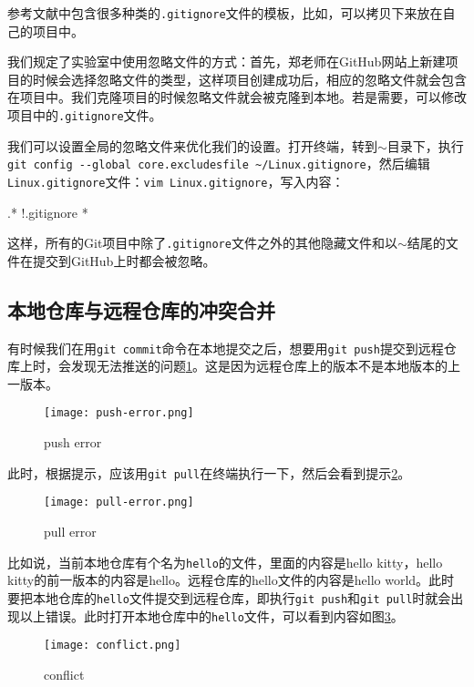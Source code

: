 \documentclass[a4paper,12pt]{article}
\begin{document}
参考文献\cite{7:misc}中包含很多种类的\verb|.gitignore|文件的模板，比如，可以拷贝下来放在自己的项目中。

我们规定了实验室中使用忽略文件的方式：首先，郑老师在GitHub网站上新建项目的时候会选择忽略文件的类型，这样项目创建成功后，相应的忽略文件就会包含在项目中。我们克隆项目的时候忽略文件就会被克隆到本地。若是需要，可以修改项目中的\verb|.gitignore|文件。

我们可以设置全局的忽略文件来优化我们的设置。打开终端，转到$\sim$目录下，执行\lstinline|git config --global core.excludesfile ~/Linux.gitignore|，然后编辑\verb|Linux.gitignore|文件：\lstinline|vim Linux.gitignore|，写入内容：
\begin{plaintext}
.*
!.gitignore
*~
\end{plaintext}
这样，所有的Git项目中除了\verb|.gitignore|文件之外的其他隐藏文件和以$\sim$结尾的文件在提交到GitHub上时都会被忽略。

\subsection{本地仓库与远程仓库的冲突合并}

有时候我们在用\lstinline|git commit|命令在本地提交之后，想要用\lstinline|git push|提交到远程仓库上时，会发现无法推送的问题\ref{fig:6}。这是因为远程仓库上的版本不是本地版本的上一版本。

\begin{figure}[!htb] %
\centering
\texttt{[image: push-error.png]}
\caption{push error}\label{fig:6}
\end{figure}

此时，根据提示，应该用\lstinline|git pull|在终端执行一下，然后会看到提示\ref{fig:7}。

\begin{figure}[!htb] %
\centering
\texttt{[image: pull-error.png]}
\caption{pull error}\label{fig:7}
\end{figure}

比如说，当前本地仓库有个名为\verb|hello|的文件，里面的内容是hello kitty，hello kitty的前一版本的内容是hello。远程仓库的hello文件的内容是hello world。此时要把本地仓库的\verb|hello|文件提交到远程仓库，即执行\lstinline|git push|和\lstinline|git pull|时就会出现以上错误。此时打开本地仓库中的\verb|hello|文件，可以看到内容如图\ref{fig:8}。

\begin{figure}[!htb] %
\centering
\texttt{[image: conflict.png]}
\caption{conflict}\label{fig:8}
\end{figure}
\end{document}
